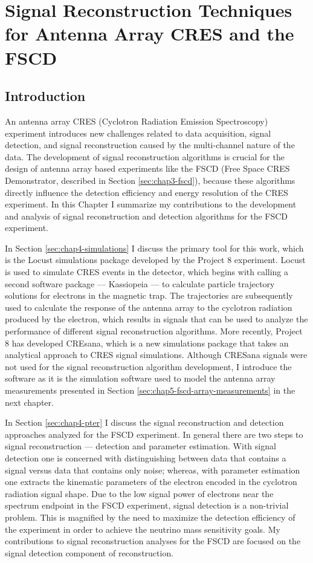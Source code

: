 \chapter{Signal Reconstruction Techniques for Antenna Array CRES and the FSCD}

\section{Introduction}

An antenna array CRES (Cyclotron Radiation Emission Spectroscopy) experiment introduces new challenges related to data acquisition, signal detection, and signal reconstruction caused by the multi-channel nature of the data. The development of signal reconstruction algorithms \cite{p8phase3trigger} is crucial for the design of antenna array based experiments like the FSCD (Free Space CRES Demonstrator, described in Section \ref{sec:chap3-fscd}), because these algorithms directly influence the detection efficiency and energy resolution of the CRES experiment. In this Chapter I summarize my contributions to the development and analysis of signal reconstruction and detection algorithms for the FSCD experiment.

In Section \ref{sec:chap4-simulations} I discuss the primary tool for this work, which is the Locust simulations package developed by the Project 8 experiment. Locust is used to simulate CRES events in the detector, which begins with calling a second software package --- Kassiopeia --- to calculate particle trajectory solutions for electrons in the magnetic trap. The trajectories are subsequently used to calculate the response of the antenna array to the cyclotron radiation produced by the electron, which results in signals that can be used to analyze the performance of different signal reconstruction algorithms. More recently, Project 8 has developed CREsana, which is a new simulations package that takes an analytical approach to CRES signal simulations. Although CRESana signals were not used for the signal reconstruction algorithm development, I introduce the software as it is the simulation software used to model the antenna array measurements presented in Section \ref{sec:chap5-fscd-array-measurements} in the next chapter.

In Section \ref{sec:chap4-pter} I discuss the signal reconstruction and detection approaches analyzed for the FSCD experiment. In general there are two steps to signal reconstruction --- detection and parameter estimation. With signal detection one is concerned with distinguishing between data that contains a signal versus data that contains only noise; whereas, with parameter estimation one extracts the kinematic parameters of the electron encoded in the cyclotron radiation signal shape. Due to the low signal power of electrons near the spectrum endpoint in the FSCD experiment, signal detection is a non-trivial problem. This is magnified by the need to maximize the detection efficiency of the experiment in order to achieve the neutrino mass sensitivity goals. My contributions to signal reconstruction analyses for the FSCD are focused on the signal detection component of reconstruction.

